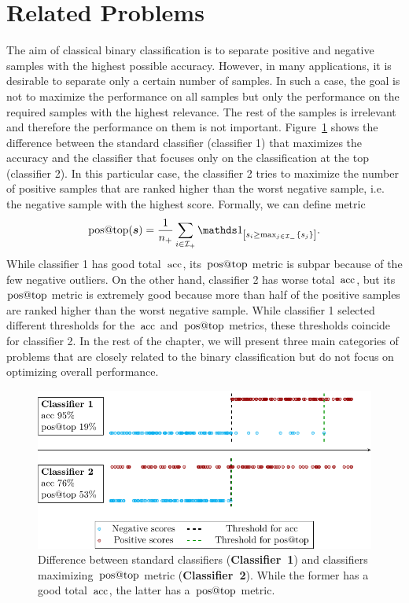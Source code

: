 \section{Related Problems}

The aim of classical binary classification is to separate positive and negative samples with the highest possible accuracy. However, in many applications, it is desirable to separate only a certain number of samples. In such a case, the goal is not to maximize the performance on all samples but only the performance on the required samples with the highest relevance. The rest of the samples is irrelevant and therefore the performance on them is not important. Figure~\ref{fig: standard vs. aatp} shows the difference between the standard classifier (classifier 1) that maximizes the accuracy and the classifier that focuses only on the classification at the top (classifier 2). In this particular case, the classifier 2 tries to maximize the number of positive samples that are ranked higher than the worst negative sample, i.e. the negative sample with the highest score. Formally, we can define metric
\begin{equation*}
  \postop(\bm{s}) = \frac{1}{\npos} \sum_{i \in \Ipos} \Iverson{s_i \ge \max_{j \in \Ineg}\{s_j\}}.
\end{equation*}
While classifier 1 has good total~$\operatorname{acc}$, its~$\operatorname{pos@top}$ metric is subpar because of the few negative outliers. On the other hand, classifier 2 has worse total~$\operatorname{acc}$, but its~$\operatorname{pos@top}$ metric is extremely good because more than half of the positive samples are ranked higher than the worst negative sample. While classifier 1 selected different thresholds for the~$\operatorname{acc}$ and~$\operatorname{pos@top}$ metrics, these thresholds coincide for classifier 2. In the rest of the chapter, we will present three main categories of problems that are closely related to the binary classification but do not focus on optimizing overall performance.

\begin{figure}[t]
  \centering
  \includegraphics[width = \linewidth]{images/standard_aatp_comparison.pdf}
  \caption{Difference between standard classifiers (\textbf{Classifier~1}) and classifiers maximizing~$\operatorname{pos@top}$ metric (\textbf{Classifier~2}). While the former has a good total~$\operatorname{acc}$, the latter has a~$\operatorname{pos@top}$ metric.}
  \label{fig: standard vs. aatp}
\end{figure}


